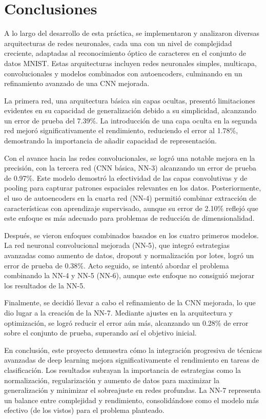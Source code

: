 \section{Conclusiones}

A lo largo del desarrollo de esta práctica, se implementaron y analizaron diversas arquitecturas de redes neuronales, cada una con un nivel de complejidad creciente, adaptadas al reconocimiento óptico de caracteres en el conjunto de datos MNIST. Estas arquitecturas incluyen redes neuronales simples, multicapa, convolucionales y modelos combinados con autoencoders, culminando en un refinamiento avanzado de una CNN mejorada. 

La primera red, una arquitectura básica sin capas ocultas, presentó limitaciones evidentes en su capacidad de generalización debido a su simplicidad, alcanzando un error de prueba del 7.39\%. La introducción de una capa oculta en la segunda red mejoró significativamente el rendimiento, reduciendo el error al 1.78\%, demostrando la importancia de añadir capacidad de representación.

Con el avance hacia las redes convolucionales, se logró una notable mejora en la precisión, con la tercera red (CNN básica, NN-3) alcanzando un error de prueba de 0.97\%. Este modelo demostró la efectividad de las capas convolutivas y de pooling para capturar patrones espaciales relevantes en los datos. Posteriormente, el uso de autoencoders en la cuarta red (NN-4) permitió combinar extracción de características con aprendizaje supervisado, aunque su error de 2.10\% reflejó que este enfoque es más adecuado para problemas de reducción de dimensionalidad.

Después, se vieron enfoques combinados basados en los cuatro primeros modelos. La red neuronal convolucional mejorada (NN-5), que integró estrategias avanzadas como aumento de datos, dropout y normalización por lotes, logró un error de prueba de 0.38\%. Acto seguido, se intentó abordar el problema combinando la NN-4 y NN-5 (NN-6), aunque este enfoque no consiguió mejorar los resultados de la NN-5. 

Finalmente, se decidió llevar a cabo el refinamiento de la CNN mejorada, lo que dio lugar a la creación de la NN-7. Mediante ajustes en la arquitectura y optimización, se logró reducir el error aún más, alcanzando un 0.28\% de error sobre el conjunto de prueba, superando así el objetivo inicial.

En conclusión, este proyecto demuestra cómo la integración progresiva de técnicas avanzadas de deep learning mejora significativamente el rendimiento en tareas de clasificación. Los resultados subrayan la importancia de estrategias como la normalización, regularización y aumento de datos para maximizar la generalización y minimizar el sobreajuste en redes profundas. La NN-7 representa un balance entre complejidad y rendimiento, consolidándose como el modelo más efectivo (de los vistos) para el problema planteado.


